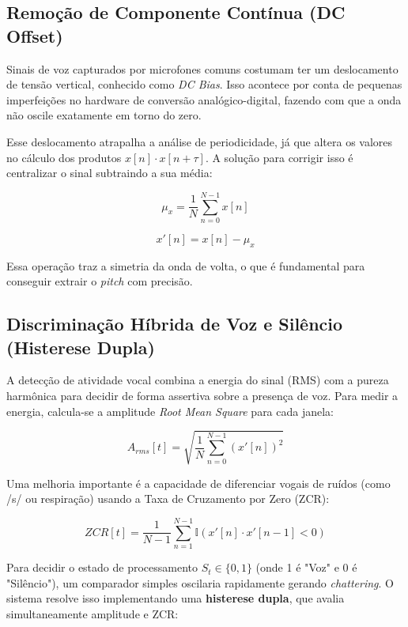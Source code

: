 \documentclass[11pt, a4paper]{article}
\theoremstyle{plain}
\theoremstyle{definition}
\begin{document}
\subsection{Remoção de Componente Contínua (DC Offset)}
Sinais de voz capturados por microfones comuns costumam ter um deslocamento de tensão vertical, conhecido como \textit{DC Bias}. Isso acontece por conta de pequenas imperfeições no hardware de conversão analógico-digital, fazendo com que a onda não oscile exatamente em torno do zero.

Esse deslocamento atrapalha a análise de periodicidade, já que altera os valores no cálculo dos produtos $x[n] \cdot x[n+\tau]$. A solução para corrigir isso é centralizar o sinal subtraindo a sua média:

\begin{equation}
    \mu_x = \frac{1}{N} \sum_{n=0}^{N-1} x[n]
\end{equation}

\begin{equation}
    x'[n] = x[n] - \mu_x
\end{equation}

Essa operação traz a simetria da onda de volta, o que é fundamental para conseguir extrair o \textit{pitch} com precisão.

\subsection{Discriminação Híbrida de Voz e Silêncio (Histerese Dupla)}

A detecção de atividade vocal combina a energia do sinal (RMS) com a pureza harmônica para decidir de forma assertiva sobre a presença de voz. Para medir a energia, calcula-se a amplitude \textit{Root Mean Square} para cada janela:

\begin{equation}
    A_{rms}[t] = \sqrt{\frac{1}{N} \sum_{n=0}^{N-1} (x'[n])^2}
\end{equation}

Uma melhoria importante é a capacidade de diferenciar vogais de ruídos (como /s/ ou respiração) usando a Taxa de Cruzamento por Zero (ZCR):

\begin{equation}
    ZCR[t] = \frac{1}{N-1} \sum_{n=1}^{N-1} \mathbb{I}(x'[n] \cdot x'[n-1] < 0)
\end{equation}

Para decidir o estado de processamento $S_t \in \{0, 1\}$ (onde 1 é "Voz" e 0 é "Silêncio"), um comparador simples oscilaria rapidamente gerando \textit{chattering}. O sistema resolve isso implementando uma \textbf{histerese dupla}, que avalia simultaneamente amplitude e ZCR:
\end{document}
